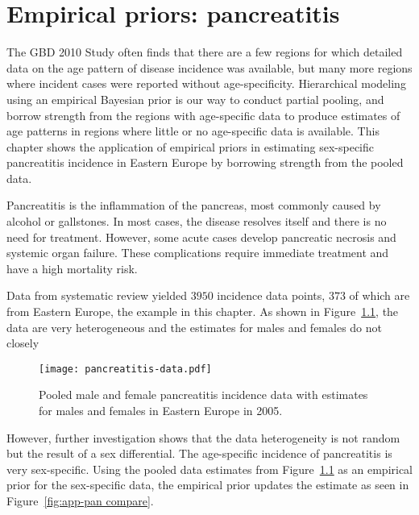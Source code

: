\chapter{Empirical priors: pancreatitis}
\label{applications-priors_empirical}

The GBD 2010 Study often finds that there are a few regions for which detailed data on the
age pattern of disease incidence was available, but many more regions
where incident cases were reported without age-specificity.
Hierarchical modeling using an empirical Bayesian prior is our way to
conduct partial pooling, and borrow strength from the regions with
age-specific data to produce estimates of age patterns in regions
where little or no age-specific data is available.  This chapter shows
the application of empirical priors in estimating sex-specific pancreatitis incidence in
Eastern Europe by borrowing strength from the pooled data.

Pancreatitis is the inflammation of the pancreas, most commonly
caused by alcohol or gallstones.  In most cases, the disease resolves
itself and there is no need for treatment.  However, some acute
cases develop pancreatic necrosis and systemic organ failure.  These
complications require immediate treatment and have a high mortality risk.
\cite{raraty_acute_2004, banks_epidemiology_2002, sekimoto_JPN_2006}

Data from systematic review yielded $3950$ incidence data points, $373$ of which
are from Eastern Europe, the example in this chapter.  As shown in
Figure~\ref{fig:app-pan data}, the data are very heterogeneous and the 
estimates for males and females do not closely

    \begin{figure}[h]
        \begin{center}
            \texttt{[image: pancreatitis-data.pdf]}
            \caption{Pooled male and female pancreatitis incidence data
              with estimates for males and females in Eastern Europe in 2005.}
            \label{fig:app-pan data}
        \end{center}
    \end{figure}

However, further investigation shows that the data heterogeneity is not
random but the result of a sex differential.  The age-specific incidence
of pancreatitis is very sex-specific.  Using the pooled data estimates from Figure~\ref{fig:app-pan data} as an empirical prior for the sex-specific 
data, the empirical prior updates the estimate as seen in Figure~\ref{fig:app-pan compare}.

